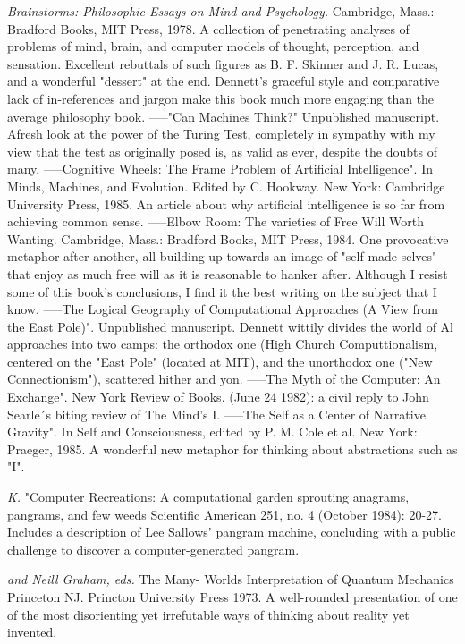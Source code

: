  {\sl Brainstorms: Philosophic Essays on Mind and Psychology.} Cambridge, Mass.: Bradford Books, MIT Press, 1978. A collection of penetrating analyses of problems of mind, brain, and computer models of thought, perception, and sensation. Excellent rebuttals of such figures as B. F. Skinner and J. R. Lucas, and a wonderful "dessert" at the end. Dennett's graceful style and comparative lack of in-references and jargon make this book much more engaging than the average philosophy book. -----"Can Machines Think?" Unpublished manuscript. Afresh look at the power of the Turing Test, completely in sympathy with my view that the test as originally posed is, as valid as ever, despite the doubts of many. -----Cognitive Wheels: The Frame Problem of Artificial Intelligence". In Minds, Machines, and Evolution. Edited by C. Hookway. New York: Cambridge University Press, 1985. An article about why artificial intelligence is so far from achieving common sense. -----Elbow Room: The varieties of Free Will Worth Wanting. Cambridge, Mass.: Bradford Books, MIT Press, 1984. One provocative metaphor after another, all building up towards an image of "self-made selves" that enjoy as much free will as it is reasonable to hanker after. Although I resist some of this book's conclusions, I find it the best writing on the subject that I know. -----The Logical Geography of Computational Approaches (A View from the East Pole)". Unpublished manuscript. Dennett wittily divides the world of Al approaches into two camps: the orthodox one (High Church Computtionalism, centered on the "East Pole" (located at MIT), and the unorthodox one ("New Connectionism"), scattered hither and yon. -----The Myth of the Computer: An Exchange". New York Review of Books. (June 24 1982): a civil reply to John Searle´s biting review of The Mind's I. -----The Self as a Center of Narrative Gravity". In Self and Consciousness, edited by P. M. Cole et al. New York: Praeger, 1985. A wonderful new metaphor for thinking about abstractions such as "I".

 {\sl K.} "Computer Recreations: A computational garden sprouting anagrams, pangrams, and few weeds Scientific American 251, no. 4 (October 1984): 20-27. Includes a description of Lee Sallows' pangram machine, concluding with a public challenge to discover a computer-generated pangram.

 {\sl and Neill Graham, eds.} The Many- Worlds Interpretation of Quantum Mechanics Princeton NJ. Princton University Press 1973. A well-rounded presentation of one of the most disorienting yet irrefutable ways of thinking about reality yet invented.

